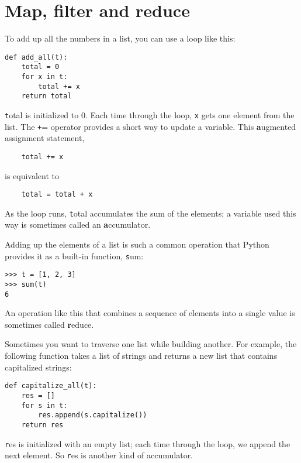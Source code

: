 \documentclass[
DIV=11,
fontsize=13,
twoside,
headinclude=false,
titlepage=firstiscover,
abstract=true,
headsepline=true,
footsepline=true,
chapterprefix=true, %
headings=big,
bibliography=totoc,%
captions=tableheading
]{scrbook}
\theoremstyle{definition}
\begin{document}
\section{Map, filter and reduce}
\label{filter}

To add up all the numbers in a list, you can use a loop like this:


\begin{lstlisting}
def add_all(t):
    total = 0
    for x in t:
        total += x
    return total
\end{lstlisting}
%
{\texttt total} is initialized to 0.  Each time through the loop,
{\texttt x} gets one element from the list.  The {\texttt +=} operator
provides a short way to update a variable.  This 
{\textbf augmented assignment statement},

\begin{lstlisting}
    total += x
\end{lstlisting}
%
is equivalent to

\begin{lstlisting}
    total = total + x
\end{lstlisting}
%
As the loop runs, {\texttt total} accumulates the sum of the
elements; a variable used this way is sometimes called an
{\textbf accumulator}.

Adding up the elements of a list is such a common operation
that Python provides it as a built-in function, {\texttt sum}:

\begin{lstlisting}
>>> t = [1, 2, 3]
>>> sum(t)
6
\end{lstlisting}
%
An operation like this that combines a sequence of elements into
a single value is sometimes called {\textbf reduce}.

Sometimes you want to traverse one list while building
another.  For example, the following function takes a list of strings
and returns a new list that contains capitalized strings:

\begin{lstlisting}
def capitalize_all(t):
    res = []
    for s in t:
        res.append(s.capitalize())
    return res
\end{lstlisting}
%
{\texttt res} is initialized with an empty list; each time through
the loop, we append the next element.  So {\texttt res} is another
kind of accumulator.
\end{document}
